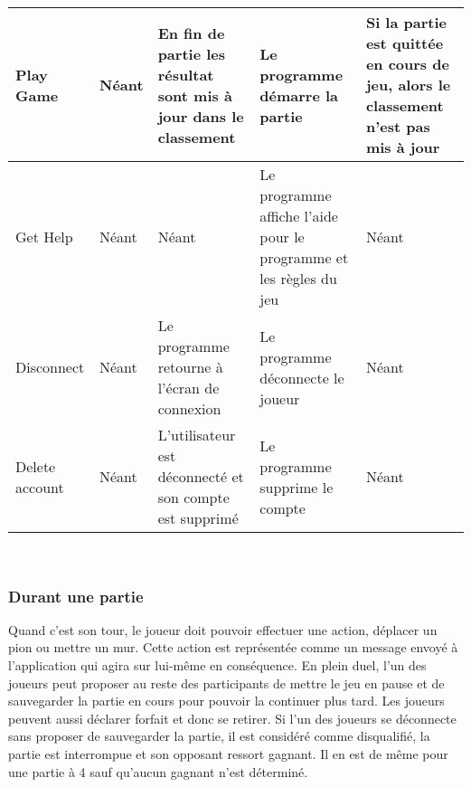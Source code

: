 \documentclass[french, utf8]{article}
\begin{document}
\newpage
\begin{center}
\begin{tabular}{|m{3cm}|m{3cm}|m{3cm}|m{3cm}|m{3cm}|}

\hline Play Game & Néant & En fin de partie les résultat sont mis à jour dans le classement & Le programme démarre la partie & Si la partie est quittée en cours de jeu, alors le classement n'est pas mis à jour \\
\hline Get Help & Néant & Néant & Le programme affiche l'aide pour le programme et les règles du jeu & Néant \\
\hline Disconnect  & Néant & Le programme retourne à l'écran de connexion & Le programme déconnecte le joueur & Néant \\
\hline Delete account  & Néant & L'utilisateur est déconnecté et son compte est supprimé & Le programme supprime le compte & Néant \\
\hline
\end{tabular}\\
\end{center}

\subsubsection{Durant une partie}
Quand c'est son tour, le joueur doit pouvoir effectuer une action, déplacer un pion ou mettre un mur. Cette action est représentée comme un message envoyé à l'application qui agira sur lui-même en conséquence.
En plein duel, l'un des joueurs peut proposer au reste des participants de mettre le jeu en pause et de sauvegarder la partie en cours pour pouvoir la continuer plus tard. Les joueurs peuvent aussi déclarer forfait et donc se retirer. \newline
Si l'un des joueurs se déconnecte sans proposer de sauvegarder la partie, il est considéré comme disqualifié, la partie est interrompue et son opposant ressort gagnant. Il en est de même pour une partie à 4 sauf qu'aucun gagnant n'est déterminé.
\newline
\end{document}
